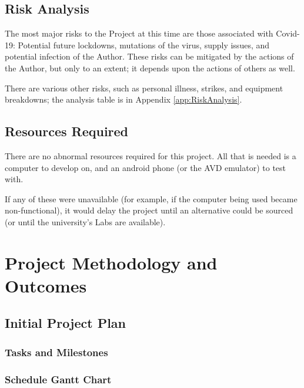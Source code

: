 \documentclass[11pt, a4paper, notitlepage]{report}
\begin{document}
\section{Risk Analysis}
The most major risks to the Project at this time are those associated with 
Covid-19: Potential future lockdowns, mutations of the virus, supply issues, 
and potential infection of the Author. These risks can be mitigated by the 
actions of the Author, but only to an extent; it depends upon the actions of 
others as well.

There are various other risks, such as personal illness, strikes, and equipment 
breakdowns; the analysis table is in Appendix \ref{app:RiskAnalysis}.

\section{Resources Required}
There are no abnormal resources required for this project. All that is needed 
is a computer to develop on, and an android phone (or the AVD emulator) to test 
with.

If any of these were unavailable (for example, if the computer being used 
became non-functional), it would delay the project until an alternative could 
be sourced (or until the university's Labs are available).

\chapter{Project Methodology and Outcomes}
\section{Initial Project Plan}
\subsection{Tasks and Milestones}
\subsection{Schedule Gantt Chart}\label{subsec:schedGanttCt}
\end{document}
